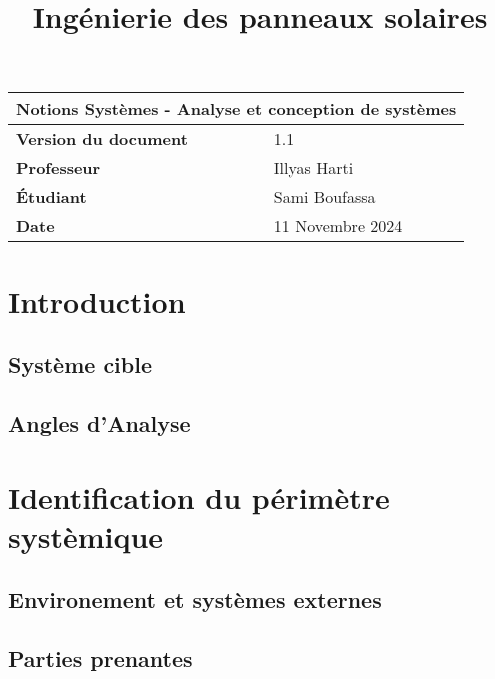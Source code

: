 \documentclass{article}
\title{Ingénierie des panneaux solaires}
\author{}
\date{\vspace{-5ex}}
\begin{document}
\maketitle

\begin{center}
    \begin{tabular}{|l|l|}
        \hline
        \multicolumn{2}{|c|}{\textbf{Notions Systèmes - Analyse et conception de systèmes}} \\
        \hline
        \textbf{Version du document} & 1.1 \\
        \hline
        \textbf{Professeur} & Illyas Harti\\
        \hline
        \textbf{Étudiant} & Sami Boufassa\\
                            
        \hline
        \textbf{Date} & 11 Novembre 2024 \\
        \hline
    \end{tabular}
\end{center}

\tableofcontents

\newpage

\section{Introduction}


\subsection{Système cible}


\subsection{Angles d'Analyse}

\subsection{}


\section{Identification du périmètre systèmique}


\subsection{Environement et systèmes externes}
\subsection{Parties prenantes}
\end{document}
